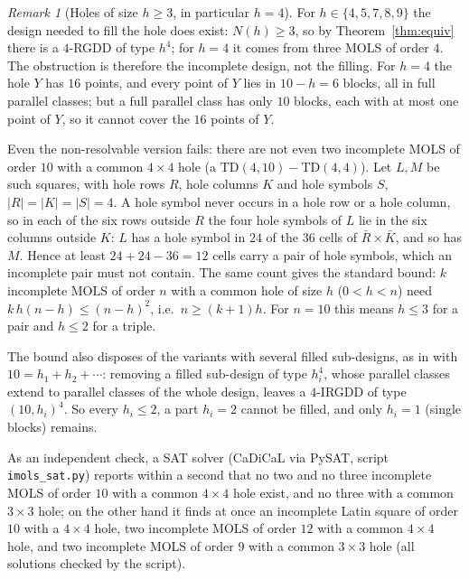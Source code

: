 \documentclass[11pt]{article}
\theoremstyle{remark}
\newtheorem{remark}[theorem]{Remark}
\newcommand{\TD}{\mathrm{TD}}
\begin{document}
\begin{remark}[Holes of size $h\ge 3$, in particular $h=4$]\label{rem:h4}
For $h\in\{4,5,7,8,9\}$ the design needed to fill the hole does exist: $N(h)\ge 3$, so by
Theorem~\ref{thm:equiv} there is a $4$-RGDD of type $h^{4}$; for $h=4$ it comes from three
MOLS of order $4$.  The obstruction is therefore the incomplete design, not the filling.
For $h=4$ the hole $Y$ has $16$ points, and every point of $Y$ lies in $10-h=6$ blocks, all
in full parallel classes; but a full parallel class has only $10$ blocks, each with at
most one point of $Y$, so it cannot cover the $16$ points of $Y$.

Even the non-resolvable version fails: there are not even two incomplete MOLS of order $10$
with a common $4\times 4$ hole (a $\TD(4,10)-\TD(4,4)$).  Let $L,M$ be such squares, with
hole rows $R$, hole columns $K$ and hole symbols $S$, $|R|=|K|=|S|=4$.  A hole symbol never
occurs in a hole row or a hole column, so in each of the six rows outside $R$ the four hole
symbols of $L$ lie in the six columns outside $K$: $L$ has a hole symbol in $24$ of the
$36$ cells of $\bar R\times\bar K$, and so has $M$.  Hence at least $24+24-36=12$ cells
carry a pair of hole symbols, which an incomplete pair must not contain.  The same count
gives the standard bound: $k$ incomplete MOLS of order $n$ with a common hole of size $h$
($0<h<n$) need $k\,h(n-h)\le (n-h)^{2}$, i.e.\ $n\ge (k+1)h$.  For $n=10$ this means
$h\le 3$ for a pair and $h\le 2$ for a triple.

The bound also disposes of the variants with several filled sub-designs, as in
\cite[Construction~4.3]{WG14} with $10=h_1+h_2+\cdots$: removing a filled sub-design of
type $h_i^{4}$, whose parallel classes extend to parallel classes of the whole design,
leaves a $4$-IRGDD of type $(10,h_i)^{4}$.  So every $h_i\le 2$, a part $h_i=2$ cannot be
filled, and only $h_i=1$ (single blocks) remains.

As an independent check, a SAT solver (CaDiCaL via PySAT, script \texttt{imols\_sat.py})
reports within a second that no two and no three incomplete MOLS of order $10$ with a
common $4\times 4$ hole exist, and no three with a common $3\times 3$ hole; on the other
hand it finds at once an incomplete Latin square of order $10$ with a $4\times 4$ hole,
two incomplete MOLS of order $12$ with a common $4\times 4$ hole, and two incomplete MOLS
of order $9$ with a common $3\times 3$ hole (all solutions checked by the script).
\end{remark}
\end{document}
